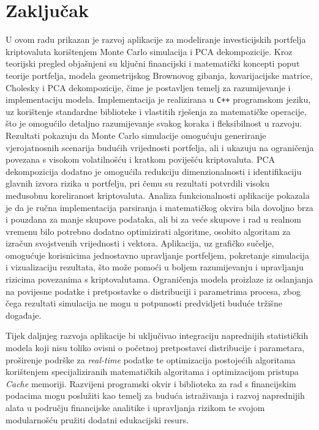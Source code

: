 \documentclass[zavrsnirad, upload]{fer}
\begin{document}
\chapter{Zaključak}
\label{pog:zakljucak}
U ovom radu prikazan je razvoj aplikacije za modeliranje investicijskih
portfelja kriptovaluta korištenjem Monte Carlo simulacija
i PCA dekompozicije. Kroz teorijski pregled objašnjeni su ključni
financijski i matematički koncepti poput teorije portfelja, modela
geometrijskog Brownovog gibanja, kovarijacijske matrice,
Cholesky i PCA dekompozicije, čime je postavljen temelj za razumijevanje
i implementaciju modela. Implementacija je realizirana u \texttt{C++} programskom
jeziku, uz korištenje standardne biblioteke i vlastitih rješenja za
matematičke operacije, što je omogućilo detaljno razumijevanje svakog
koraka i fleksibilnost u razvoju.
Rezultati pokazuju da Monte Carlo simulacije omogućuju generiranje
vjerojatnosnih scenarija budućih vrijednosti portfelja, ali i ukazuju na
ograničenja povezana s visokom volatilnošću i kratkom poviješću kriptovaluta.
PCA dekompozicija dodatno je omogućila redukciju dimenzionalnosti i
identifikaciju glavnih izvora rizika u portfelju, pri čemu su rezultati
potvrdili visoku međusobnu koreliranost kriptovaluta. Analiza
funkcionalnosti aplikacije pokazala je da je ručna implementacija
parsiranja i matematičkog okvira bila dovoljno brza i pouzdana za manje
skupove podataka, ali bi za veće skupove i rad u realnom vremenu bilo
potrebno dodatno optimizirati algoritme, osobito algoritam za izračun svojstvenih
vrijednosti i vektora.
Aplikacija, uz grafičko sučelje, omogućuje korisnicima jednostavno
upravljanje portfeljem, pokretanje simulacija i vizualizaciju rezultata,
što može pomoći u boljem razumijevanju i upravljanju rizicima povezanima s
kriptovalutama. Ograničenja modela proizlaze iz oslanjanja na povijesne
podatke i pretpostavke o distribuciji i parametrima procesa, zbog čega rezultati
simulacija ne mogu u potpunosti predvidjeti buduće tržišne događaje.

Tijek daljnjeg razvoja aplikacije bi uključivao integraciju naprednijih
statističkih modela koji nisu toliko ovisni o početnoj pretpostavci
distribucije i parametara, proširenje podrške za \textit{real-time}
podatke te optimizacija postojećih algoritama korištenjem specijaliziranih
matematičkih algoritama i optimizacijom pristupa \textit{Cache} memoriji.
Razvijeni programski okvir i biblioteka za rad s
financijskim podacima mogu poslužiti kao temelj za buduća istraživanja i
razvoj naprednijih alata u području financijske analitike i upravljanja
rizikom te svojom modularnošću pružiti dodatni edukacijski resurs.
\end{document}

